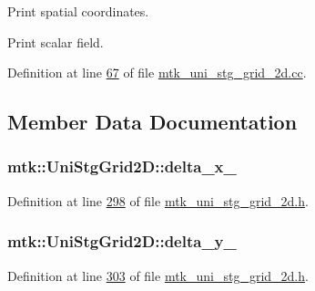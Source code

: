 \begin{DoxyEnumerate}
\item Print spatial coordinates.
\item Print scalar field. 
\end{DoxyEnumerate}

Definition at line \hyperlink{mtk__uni__stg__grid__2d_8cc_source_l00067}{67} of file \hyperlink{mtk__uni__stg__grid__2d_8cc_source}{mtk\+\_\+uni\+\_\+stg\+\_\+grid\+\_\+2d.\+cc}.



\subsection{Member Data Documentation}
\hypertarget{classmtk_1_1UniStgGrid2D_ab1fbb3cf685c51f434488e378564bd2a}{
\subsubsection[{delta\+\_\+x\+\_\+}]{ mtk\+::\+Uni\+Stg\+Grid2\+D\+::delta\+\_\+x\+\_\+\hspace{0.3cm}{\ttfamily [private]}}}\label{classmtk_1_1UniStgGrid2D_ab1fbb3cf685c51f434488e378564bd2a}


Definition at line \hyperlink{mtk__uni__stg__grid__2d_8h_source_l00298}{298} of file \hyperlink{mtk__uni__stg__grid__2d_8h_source}{mtk\+\_\+uni\+\_\+stg\+\_\+grid\+\_\+2d.\+h}.

\hypertarget{classmtk_1_1UniStgGrid2D_ace5af3c991f241a895318b9761db73eb}{
\subsubsection[{delta\+\_\+y\+\_\+}]{ mtk\+::\+Uni\+Stg\+Grid2\+D\+::delta\+\_\+y\+\_\+\hspace{0.3cm}{\ttfamily [private]}}}\label{classmtk_1_1UniStgGrid2D_ace5af3c991f241a895318b9761db73eb}


Definition at line \hyperlink{mtk__uni__stg__grid__2d_8h_source_l00303}{303} of file \hyperlink{mtk__uni__stg__grid__2d_8h_source}{mtk\+\_\+uni\+\_\+stg\+\_\+grid\+\_\+2d.\+h}.

